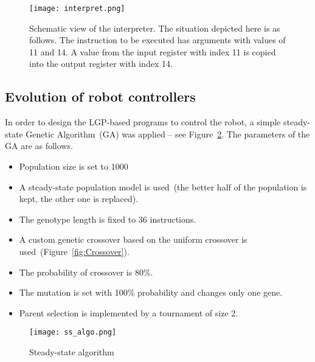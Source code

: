 \documentclass{ExcelAtFIT}
\begin{document}
\begin{figure}[h]
	\centering
	{\texttt{[image: interpret.png]}}
	\caption{
	Schematic view of the interpreter.
	The situation depicted here is as follows.
	The instruction to be executed has arguments with values of 11 and 14.
	A value from the input register with index 11 is copied into the output register with index 14.
	}
	\label{fig:Interpret}
\end{figure}



\subsection{Evolution of robot controllers}
\label{sec:EvolutionOfRobotControllers}
In order to design the LGP-based programs to control the robot, a simple steady-state Genetic Algorithm~(GA) was applied -- see Figure~\ref{fig:SteadyStateAlgorithm}.
The parameters of the GA are as follows.

\begin{itemize}
	\item Population size is set to 1000
	\item A steady-state population model is used~(the better half of the population is kept, the other one is replaced).
	\item The genotype length is fixed to 36 instructions.
	\item A custom genetic crossover based on the uniform crossover is used~(Figure~\ref{fig:Crossover}).
	\item The probability of crossover is 80\%.
	\item The mutation is set with 100\% probability and changes only one gene.
	\item Parent selection is implemented by a tournament of size 2.
\end{itemize}

\begin{figure}[h]
	\centering
	{\texttt{[image: ss\_algo.png]}}
	\caption{
	Steady-state algorithm
	}
	\label{fig:SteadyStateAlgorithm}
\end{figure}
\end{document}
